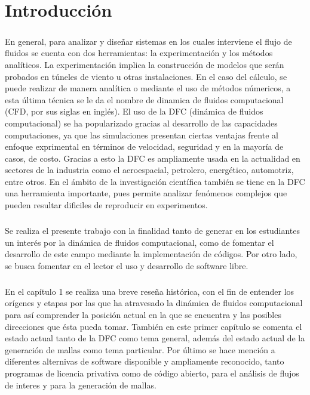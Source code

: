 \documentclass[letterpaper, openright, 12pt]{book}
\begin{document}
    \chapter*{Introducción}
    \paragraph*{}
    En general, para analizar y diseñar sistemas en los cuales interviene el
    flujo de fluidos se cuenta con dos herramientas: la experimentación y los
    métodos analíticos. La experimentación implica la construcción de modelos
    que serán probados en túneles de viento u otras instalaciones. En el caso
    del cálculo, se puede realizar de manera analítica o mediante el uso de
    métodos númericos, a esta última técnica se le da el nombre de dinamica de
    fluidos computacional (CFD, por sus siglas en inglés). El uso de la DFC
    (dinámica de fluidos computacional) se ha popularizado gracias al
    desarrollo de las capacidades computaciones, ya que las simulaciones
    presentan ciertas ventajas frente al enfoque exprimental en términos de
    velocidad, seguridad y en la mayoría de casos, de costo. Gracias a esto la
    DFC es ampliamente usada en la actualidad en sectores de la industria como
    el aeroespacial, petrolero, energético, automotriz, entre otros. En el
    ámbito de la investigación científica también se tiene en la DFC una
    herramienta importante, pues permite analizar fenómenos complejos que
    pueden resultar dificiles de reproducir en experimentos.

    \paragraph*{}
    Se realiza el presente trabajo con la finalidad tanto de generar en los
    estudiantes un interés por la dinámica de fluidos computacional, como
    de fomentar el desarrollo de este campo mediante la implementación de
    códigos. Por otro lado, se busca fomentar en el lector el uso y desarrollo
    de software libre.

    \paragraph*{}
    En el capítulo 1 se realiza una breve reseña histórica, con el fin de
    entender los orígenes y etapas por las que ha atravesado la dinámica de
    fluidos computacional para así comprender la posición actual en la que se
    encuentra y las posibles direcciones que ésta pueda tomar. También en este
    primer capítulo se comenta el estado actual tanto de la DFC como tema
    general, además del estado actual de la generación de mallas como tema
    particular. Por último se hace mención a diferentes alternivas de software
    disponible y ampliamente reconocido, tanto programas de licencia privativa
    como de código abierto, para el análisis de flujos de interes y para la
    generación de mallas.
\end{document}
